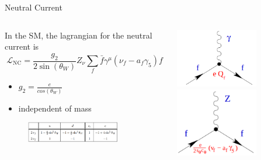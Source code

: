 \begin{frame}{Neutral Current}
    \begin{columns}
        \begin{column}{0.65\textwidth}
            In the SM, the lagrangian for the neutral current is \footnotemark{}
    \begin{equation*}
        \mathcal{L}_\text{NC} = \frac{g_2}{2 \sin{(\theta_W)}} Z_\nu \sum_f \bar{f} \gamma^\mu \left( \nu_f - a_f \gamma_5 \right) f
    \end{equation*}
    \begin{itemize}
        \item $ g_2 = \frac{e}{cos{(\theta_W)}} $
        \item independent of mass
    \end{itemize}
    \begin{figure}
        \centering
        \includegraphics[width=0.8\textwidth]{content/images/nc_coublings.png}
    \end{figure}
        \end{column}
        \begin{column}{0.35\textwidth}
            \includegraphics[width = 0.65\textwidth]{content/images/nc1.png}
            \includegraphics[width = 0.65\textwidth]{content/images/nc2.png}
        \end{column}
    \end{columns}
\end{frame}

